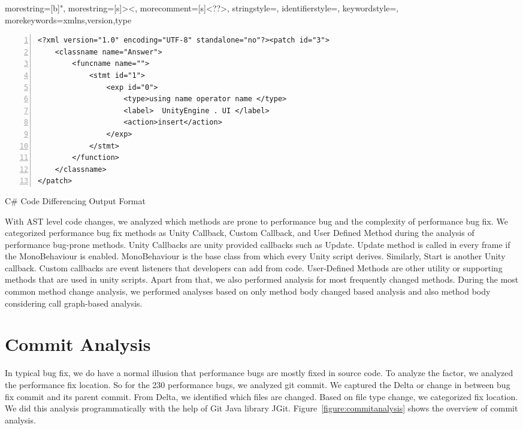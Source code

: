 

{
	morestring=[b]",
	morestring=[s]{>}{<},
	morecomment=[s]{<?}{?>},
	stringstyle=\color{black},
	identifierstyle=\color{darkblue},
	keywordstyle=\color{cyan},
	morekeywords={xmlns,version,type}%
}

\begin{example}
\begin{lstlisting}[language=XML_android, basicstyle=\ttfamily\footnotesize, numbers=left, numbersep=5pt, captionpos=b]
<?xml version="1.0" encoding="UTF-8" standalone="no"?><patch id="3">
	<classname name="Answer">
		<funcname name="">
			<stmt id="1">
				<exp id="0">
					<type>using name operator name </type>
					<label>  UnityEngine . UI </label>
					<action>insert</action>
				</exp>
			</stmt>
		</function>
	</classname>
</patch>
	\end{lstlisting}
	\caption{C\# Code Differencing Output Format}
	\label{example:changerep}
	\vspace{-0.2cm}
\end{example}

With AST level code changes, we analyzed which methods are prone to performance bug and the complexity of performance bug fix. We categorized performance bug fix methods as Unity Callback, Custom Callback, and User Defined Method during the analysis of performance bug-prone methods. Unity Callbacks are unity provided callbacks such as Update. Update method is called in every frame if the MonoBehaviour is enabled. MonoBehaviour is the base class from which every Unity script derives. Similarly, Start is another Unity callback. Custom callbacks are event listeners that developers can add from code. User-Defined Methods are other utility or supporting methods that are used in unity scripts. Apart from that, we also performed analysis for most frequently changed methods. During the most common method change analysis, we performed analyses based on only method body changed based analysis and also method body considering call graph-based analysis.



\section{Commit Analysis}
\label{sec:commitanalysis}
In typical bug fix, we do have a normal illusion that performance bugs are mostly fixed in source code. To analyze the factor, we analyzed the performance fix location. So for the 230 performance bugs, we analyzed git commit. We captured the Delta or change in between bug fix commit and its parent commit. From Delta, we identified which files are changed. Based on file type change, we categorized fix location. We did this analysis programmatically with the help of Git Java library JGit. Figure~\ref{figure:commitanalysis} shows the overview of commit analysis.

